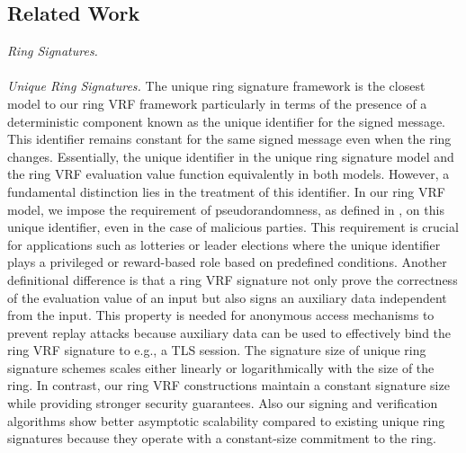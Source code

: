 
\subsection{Related Work}

\noindent\textit{Ring Signatures.} 
\\\\
\noindent\textit{Unique Ring Signatures.} The unique ring signature framework \cite{URCframework} is the closest model to our ring VRF framework particularly in terms of the presence of a deterministic component known as the unique identifier for the signed message. This identifier remains constant for the same signed message even when the ring changes.  Essentially, the unique identifier in the unique ring signature model and the ring VRF evaluation value function equivalently in both models. However, a fundamental distinction lies in the treatment of this identifier. In our ring VRF model, we impose the requirement of pseudorandomness, as defined in \cite{ucvrf,praos}, on this unique identifier, even in the case of malicious parties.
This requirement is crucial for applications such as lotteries or leader elections where the unique identifier plays a privileged or reward-based role based on predefined conditions. Another definitional difference is that a ring VRF  signature not only prove the correctness of the evaluation value of an input but also signs an auxiliary data independent from the input. This property is needed for anonymous access mechanisms to prevent replay attacks because auxiliary data can be used to effectively bind the ring VRF signature to e.g., a TLS session.
The signature size of unique ring signature schemes scales either linearly \cite{URCframework,URCfc} or logarithmically  \cite{URCblockchainprivacy,URClattice} with the size of the ring. In contrast, our ring VRF constructions maintain a constant signature size while providing stronger security guarantees. Also our signing and verification algorithms show better asymptotic scalability compared to existing unique ring signatures because they operate with a constant-size  commitment to the ring.

